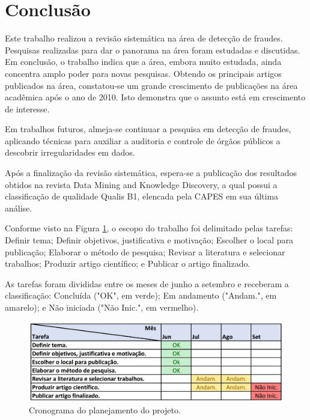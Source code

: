 \documentclass[smallextended]{svjour3}
\begin{document}
\section{Conclusão}
\label{sec:6}

Este trabalho realizou a revisão sistemática na área de detecção de fraudes. Pesquisas realizadas para dar o panorama na área foram estudadas e discutidas. Em conclusão, o trabalho indica que a área, embora muito estudada, ainda concentra amplo poder para novas pesquisas. Obtendo os principais artigos publicados na área, constatou-se um grande crescimento de publicações na área acadêmica após o ano de 2010. Isto demonstra que o assunto está em crescimento de interesse.

Em trabalhos futuros, almeja-se continuar a pesquisa em detecção de fraudes, aplicando técnicas para auxiliar a auditoria e controle de órgãos públicos a descobrir irregularidades em dados.

Após a finalização da revisão sistemática, espera-se a publicação dos resultados obtidos na revista Data Mining and Knowledge Discovery, a qual possui a classificação de qualidade Qualis B1, elencada pela CAPES em sua última análise. 

	
	
	
	\begin{appendices}
			Conforme visto na Figura \ref{fig:cronograma}, o escopo do trabalho foi delimitado pelas tarefas: Definir tema; Definir objetivos, justificativa e motivação; Escolher o local para publicação; Elaborar o método de pesquisa; Revisar a literatura e selecionar trabalhos; Produzir artigo científico; e Publicar o artigo finalizado. 
			
			As tarefas foram divididas entre os meses de junho a setembro e receberam a classificação: Concluída ("OK", em verde); Em andamento ("Andam.", em amarelo); e Não iniciada ("Não Inic.", em vermelho). 
			
			\begin{figure}[!ht]
				\centering
				\includegraphics[width=1\textwidth]{imagens/cronograma2.jpg}
				\caption{Cronograma do planejamento do projeto.}
				\label{fig:cronograma}
			\end{figure}
	\end{appendices}
	
\end{document}
